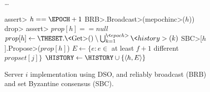 \begin{figure}[t!]
      \begin{adjustbox}{minipage=[t]{\columnwidth}}
  \begin{algorithm}[H]
    \caption{\small Server $i$ implementation using DSO, and reliably
      broadcast (BRB) and set Byzantine consensus (SBC).
       }
    \label{DPO-alg-basb}
    \small
    \begin{algorithmic}[1]
      \setcounter{ALG@line}{10} %
      \State \ldots     {}

      \label{alg2:epochinc}
        \State \<assert> $h==\EPOCH +1$
        \State \<BRB>.\<Broadcast>(\<mepochinc>($h$))\label{alg2:brb-epochinc}
      \EndFunction
        \State \<drop>
      \EndUpon
        \State \<assert> $prop[h]==null$
        \State $prop[h] \leftarrow \THESET.\text{\<Get>}() \setminus 
        \bigcup_{k=1}^{\<epoch>} \<history>(k)$\label{DPO-alg2-dsoget}
        \State \<SBC>[$h$].\<Propose>($prop[h]$)
      \EndUpon
        \State $E \leftarrow \{e:e \in $ at least $f+1$ different $propset[j]\}$
        \State $\HISTORY \leftarrow \HISTORY \cup \{\langle h, E \rangle\}$
        \EndUpon
      \end{algorithmic}
    \end{algorithm}
        \end{adjustbox}
\end{figure}
